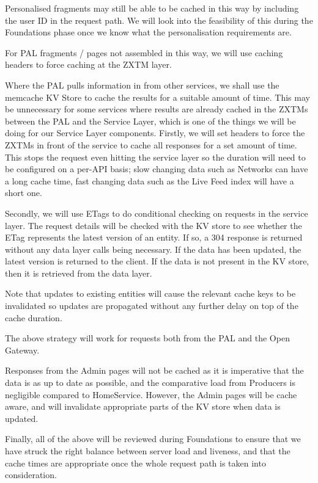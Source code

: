 \documentclass[a4paper, 11pt]{scrreprt}
\begin{document}
Personalised fragments may still be able to be cached in this way by including the user ID in the request path. We will look into the feasibility of this during the Foundations phase once we know what the personalisation requirements are.

For PAL fragments / pages not assembled in this way, we will use caching headers to force caching at the ZXTM layer. 

Where the PAL pulls information in from other services, we shall use the memcache KV Store to cache the results for a suitable amount of time. This may be unnecessary for some services where results are already cached in the ZXTMs between the PAL and the Service Layer, which is one of the things we will be doing for our Service Layer components. Firstly, we will set headers to force the ZXTMs in front of the service to cache all responses for a set amount of time. This stops the request even hitting the service layer so the duration will need to be configured on a per-API basis; slow changing data such as Networks can have a long cache time, fast changing data such as the Live Feed index will have a short one.

Secondly, we will use ETags to do conditional checking on requests in the service layer. The request details will be checked with the KV store to see whether the ETag represents the latest version of an entity. If so, a 304 response is returned without any data layer calls being necessary. If the data has been updated, the latest version is returned to the client. If the data is not present in the KV store, then it is retrieved from the data layer.

Note that updates to existing entities will cause the relevant cache keys to be invalidated so updates are propagated without any further delay on top of the cache duration.

The above strategy will work for requests both from the PAL and the Open Gateway.

Responses from the Admin pages will not be cached as it is imperative that the data is as up to date as possible, and the comparative load from Producers is negligible compared to HomeService. However, the Admin pages will be cache aware, and will invalidate appropriate parts of the KV store when data is updated.

Finally, all of the above will be reviewed during Foundations to ensure that we have struck the right balance between server load and liveness, and that the cache times are appropriate once the whole request path is taken into consideration.
\end{document}
